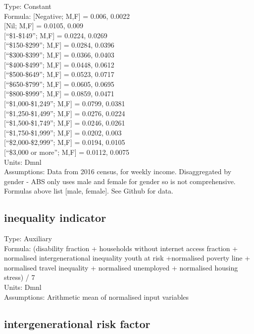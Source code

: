 \documentclass[
  11pt,
]{book}
\begin{document}
Type: Constant\\
Formula: {[}Negative; M,F{]} = 0.006, 0.0022\\
{[}Nil; M,F{]} = 0.0105, 0.009\\
{[}``\$1-\$149''; M,F{]} = 0.0224, 0.0269\\
{[}``\$150-\$299''; M,F{]} = 0.0284, 0.0396\\
{[}``\$300-\$399''; M,F{]} = 0.0366, 0.0403\\
{[}``\$400-\$499''; M,F{]} = 0.0448, 0.0612\\
{[}``\$500-\$649''; M,F{]} = 0.0523, 0.0717\\
{[}``\$650-\$799''; M,F{]} = 0.0605, 0.0695\\
{[}``\$800-\$999''; M,F{]} = 0.0859, 0.0471\\
{[}``\$1,000-\$1,249''; M,F{]} = 0.0799, 0.0381\\
{[}``\$1,250-\$1,499''; M,F{]} = 0.0276, 0.0224\\
{[}``\$1,500-\$1,749''; M,F{]} = 0.0246, 0.0261\\
{[}``\$1,750-\$1,999''; M,F{]} = 0.0202, 0.003\\
{[}``\$2,000-\$2,999''; M,F{]} = 0.0194, 0.0105\\
{[}``\$3,000 or more''; M,F{]} = 0.0112, 0.0075\\
Units: Dmnl\\
Assumptions: Data from 2016 census, for weekly income. Disaggregated by gender - ABS only uses male and female for gender so is not comprehensive. Formulas above list {[}male, female{]}. See Github for data.

\hypertarget{inequality-indicator}{%
\subsection{inequality indicator}\label{inequality-indicator}}

Type: Auxiliary\\
Formula: (disability fraction + households without internet access fraction + normalised intergenerational inequality youth at risk +normalised poverty line + normalised travel inequality + normalised unemployed
+ normalised housing stress) / 7\\
Units: Dmnl\\
Assumptions: Arithmetic mean of normalised input variables

\hypertarget{intergenerational-risk-factor}{%
\subsection{intergenerational risk factor}\label{intergenerational-risk-factor}}
\end{document}

